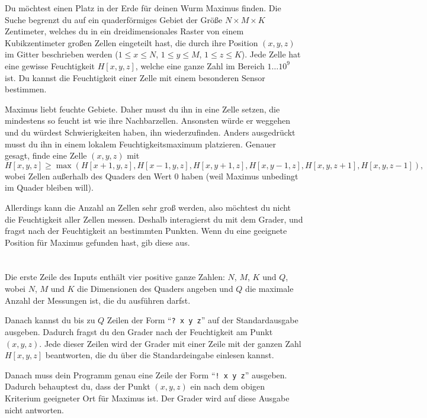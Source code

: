 \ifx\boi\undefined\fi
\def\version{jury-1}

Du möchtest einen Platz in der Erde für deinen Wurm Maximus finden. Die Suche begrenzt du auf ein quaderförmiges Gebiet der Größe $N \times M \times K$ Zentimeter, welches du in ein dreidimensionales Raster von einem Kubikzentimeter großen Zellen eingeteilt hast, die durch ihre Position $(x,y,z)$ im Gitter beschrieben werden ($1 \le x \le N$, $1 \le y \le M$, $1 \le z \le K$).
Jede Zelle hat eine gewisse Feuchtigkeit $H[x,y,z]$, welche eine ganze Zahl im Bereich $1 \dots 10^9$ ist.
Du kannst die Feuchtigkeit einer Zelle mit einem besonderen Sensor bestimmen.

Maximus liebt feuchte Gebiete. Daher musst du ihn in eine Zelle setzen, die mindestens so feucht ist wie ihre Nachbarzellen. Ansonsten würde er weggehen und du würdest Schwierigkeiten haben, ihn wiederzufinden.
Anders ausgedrückt musst du ihn in einem lokalem Feuchtigkeitsmaximum platzieren. Genauer gesagt, finde eine Zelle $(x,y,z)$ mit
$$
H[x,y,z] \ge \max(H[x+1,y,z], H[x-1,y,z], H[x,y+1,z], H[x,y-1,z], H[x,y,z+1], H[x,y,z-1]),
$$
wobei Zellen außerhalb des Quaders den Wert $0$ haben (weil Maximus unbedingt im Quader bleiben will).

Allerdings kann die Anzahl an Zellen sehr groß werden, also möchtest du nicht die Feuchtigkeit aller Zellen messen.
Deshalb interagierst du mit dem Grader, und fragst nach der Feuchtigkeit an bestimmten Punkten.
Wenn du eine geeignete Position für Maximus gefunden hast, gib diese aus.

\section*{\interactivity}
Die erste Zeile des Inputs enthält vier positive ganze Zahlen: $N$, $M$, $K$ und $Q$, wobei $N$, $M$ und $K$ die Dimensionen des Quaders angeben und $Q$ die maximale Anzahl der Messungen ist, die du ausführen darfst.

Danach kannst du bis zu $Q$ Zeilen der Form ``\texttt{?\ x y z}'' auf der Standardausgabe ausgeben.
Dadurch fragst du den Grader nach der Feuchtigkeit am Punkt $(x, y, z)$.
Jede dieser Zeilen wird der Grader mit einer Zeile mit der ganzen Zahl $H[x,y,z]$ beantworten, die du über die Standardeingabe einlesen kannst. 

Danach muss dein Programm genau eine Zeile der Form ``\texttt{!\ x y z}'' ausgeben.
Dadurch behauptest du, dass der Punkt $(x, y, z)$ ein nach dem obigen Kriterium geeigneter Ort für Maximus ist.
Der Grader wird auf diese Ausgabe nicht antworten.

